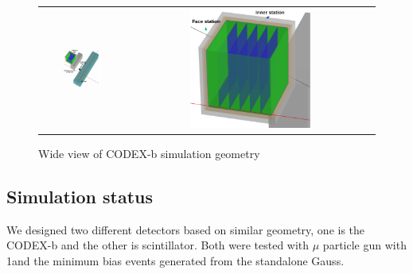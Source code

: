 \begin{figure}[h]
\begin{center}
  \begin{tabular}[t]{cc}
    \includegraphics[width=0.5\textwidth]{figs/INT/CODEXbBigGeo.pdf} &
    \includegraphics[width=0.5\textwidth]{figs/INT/ZoomVersion.pdf}
  \end{tabular}
\end{center}
\caption{
    Wide view of CODEX-b simulation geometry
}
\end{figure}

\subsection{Simulation status}

We designed two different detectors based on similar geometry, one is the CODEX-b and the other is scintillator.
Both were tested with $\mu$ particle gun with 1\tev and the minimum bias events generated from the standalone Gauss. 

